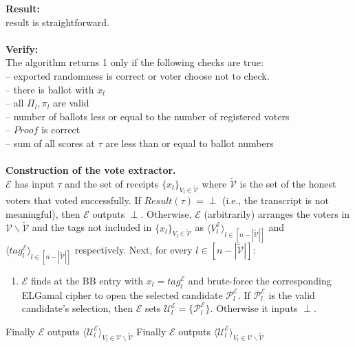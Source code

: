 \documentclass[12pt]{article}
\begin{document}
\textbf{Result:} \\
result is straightforward.\\\\
\textbf{Verify:} \\
The algorithm returns 1 only if the following checks are true:\\
--  exported randomness is correct or voter choose not to check.\\
-- there is ballot with $x_l$\\
-- all $\Pi_l, \pi_l$ are valid\\
-- number of ballots less or equal to the number of registered voters\\
-- $Proof$ is correct\\
-- sum of all scores at $\tau$ are less than or equal to ballot numbers\\\\
\textbf{Construction of the vote extractor.}\\ 
$\mathcal{E}$ has input $\tau$ and the set of receipts  $\{x_l\}_{V_l \in \tilde{\mathcal{V}}}$ where $\tilde{\mathcal{V}}$ is the set of the honest voters that voted successfully.  If $Result(\tau) = \perp$ (i.e., the transcript is not meaningful), then $\mathcal{E}$ outputs $\perp$. Otherwise, $\mathcal{E}$ (arbitrarily) arranges the voters in $\mathcal{V} \backslash \tilde{\mathcal{V}}$ and the tags not included in $\{x_l\}_{V_l \in \tilde{\mathcal{V}}}$ as $\langle V_l^{\mathcal{E}} \rangle_{l \in  [n - |\tilde{\mathcal{V}}|]}$ and $\langle tag_l^{\mathcal{E}} \rangle_{l \in  [n - |\tilde{\mathcal{V}}|]}$ respectively. Next, for every $l \in [n - |\tilde{\mathcal{V}}|]$:\\
\begin{enumerate}
\item  $\mathcal{E}$ finds at the BB entry with   $x_l = tag_l^{\mathcal{E}}$ and brute-force the corresponding ELGamal cipher to open the selected candidate $\mathcal{P}_l^{\mathcal{E}}$. If $\mathcal{P}_l^{\mathcal{E}}$ is the valid candidate's selection, then $\mathcal{E}$ sets $\mathcal{U}_l^{\mathcal{E}} = \{\mathcal{P}_l^{\mathcal{E}}\}$. Otherwise it inputs $\perp$.
\end{enumerate}
Finally $\mathcal{E}$ outputs  $\langle \mathcal{U}_l^{\mathcal{E}} \rangle_{V_l \in \mathcal{V} \backslash \tilde{\mathcal{V}}  }$
Finally $\mathcal{E}$ outputs  $\langle \mathcal{U}_l^{\mathcal{E}} \rangle_{V_l \in \mathcal{V} \backslash \tilde{\mathcal{V}}  }$

 \nocite{*}


\end{document}
